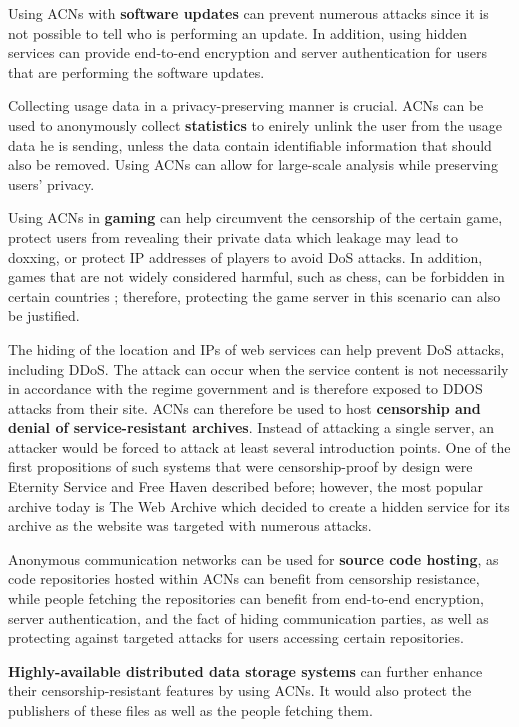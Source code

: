 Using ACNs with \textbf{software updates} can prevent numerous attacks since it is not possible to tell who is performing an update. In addition, using hidden services can provide end-to-end encryption and server authentication for users that are performing the software updates.

Collecting usage data in a privacy-preserving manner is crucial. ACNs can be used to anonymously collect \textbf{statistics} to enirely unlink the user from the usage data he is sending, unless the data contain identifiable information that should also be removed. Using ACNs can allow for large-scale analysis while preserving users' privacy.

Using ACNs in \textbf{gaming} can help circumvent the censorship of the certain game, protect users from revealing their private data which leakage may lead to doxxing, or protect IP addresses of players to avoid DoS attacks. In addition, games that are not widely considered harmful, such as chess, can be forbidden in certain countries \cite{afghanistan-chess}; therefore, protecting the game server in this scenario can also be justified.

The hiding of the location and IPs of web services can help prevent DoS attacks, including DDoS. The attack can occur when the service content is not necessarily in accordance with the regime government and is therefore exposed to DDOS attacks from their site. ACNs can therefore be used to host \textbf{censorship and denial of service-resistant archives}. Instead of attacking a single server, an attacker would be forced to attack at least several introduction points. One of the first propositions of such systems that were censorship-proof by design were Eternity Service and Free Haven described before; however, the most popular archive today is The Web Archive which decided to create a hidden service for its archive as the website was targeted with numerous attacks.

Anonymous communication networks can be used for \textbf{source code hosting}, as code repositories hosted within ACNs can benefit from censorship resistance, while people fetching the repositories can benefit from end-to-end encryption, server authentication, and the fact of hiding communication parties, as well as protecting against targeted attacks for users accessing certain repositories.

\textbf{Highly-available distributed data storage systems} can further enhance their censorship-resistant features by using ACNs. It would also protect the publishers of these files as well as the people fetching them.

